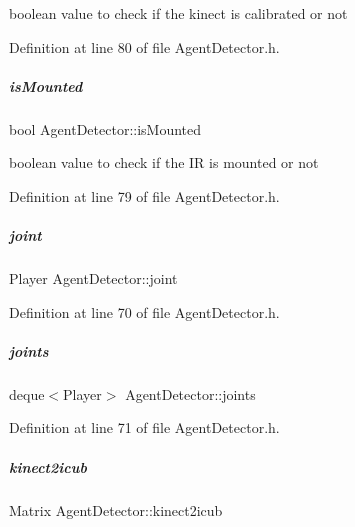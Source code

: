 boolean value to check if the kinect is calibrated or not 



Definition at line 80 of file Agent\+Detector.\+h.

\mbox{\label{group__agentDetector_a479858be24a1f5405ca47a51618dc8ce}} 
\subparagraph{\texorpdfstring{is\+Mounted}{isMounted}}
{\footnotesize\ttfamily bool Agent\+Detector\+::is\+Mounted\hspace{0.3cm}{\ttfamily [protected]}}



boolean value to check if the IR is mounted or not 



Definition at line 79 of file Agent\+Detector.\+h.

\mbox{\label{group__agentDetector_a9cc73260275a9fed6733dba7f77d61cd}} 
\subparagraph{\texorpdfstring{joint}{joint}}
{\footnotesize\ttfamily Player Agent\+Detector\+::joint\hspace{0.3cm}{\ttfamily [protected]}}



Definition at line 70 of file Agent\+Detector.\+h.

\mbox{\label{group__agentDetector_a675c7a91e1281572fdac3274585c0979}} 
\subparagraph{\texorpdfstring{joints}{joints}}
{\footnotesize\ttfamily deque$<$Player$>$ Agent\+Detector\+::joints\hspace{0.3cm}{\ttfamily [protected]}}



Definition at line 71 of file Agent\+Detector.\+h.

\mbox{\label{group__agentDetector_a2bd8fc165ecc3ddb4fa11b57255f3e28}} 
\subparagraph{\texorpdfstring{kinect2icub}{kinect2icub}}
{\footnotesize\ttfamily Matrix Agent\+Detector\+::kinect2icub\hspace{0.3cm}{\ttfamily [protected]}}



